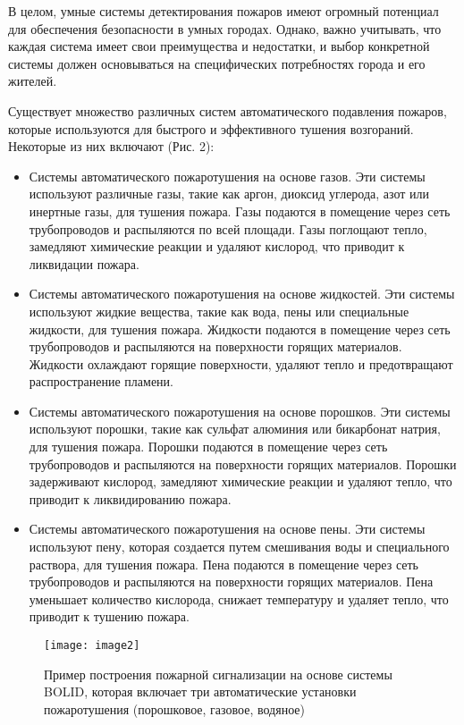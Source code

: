 \begin{multicols}{2}
В целом, умные системы детектирования пожаров имеют огромный потенциал
для обеспечения безопасности в умных городах. Однако, важно учитывать,
что каждая система имеет свои преимущества и недостатки, и выбор
конкретной системы должен основываться на специфических потребностях
города и его жителей.

Существует множество различных систем автоматического подавления
пожаров, которые используются для быстрого и эффективного тушения
возгораний. Некоторые из них включают (Рис. 2):

\begin{itemize}
\item
  Системы автоматического пожаротушения на основе газов. Эти системы
  используют различные газы, такие как аргон, диоксид углерода, азот или
  инертные газы, для тушения пожара. Газы подаются в помещение через
  сеть трубопроводов и распыляются по всей площади. Газы поглощают
  тепло, замедляют химические реакции и удаляют кислород, что приводит к
  ликвидации пожара.
\item
  Системы автоматического пожаротушения на основе жидкостей. Эти системы
  используют жидкие вещества, такие как вода, пены или специальные
  жидкости, для тушения пожара. Жидкости подаются в помещение через сеть
  трубопроводов и распыляются на поверхности горящих материалов.
  Жидкости охлаждают горящие поверхности, удаляют тепло и предотвращают
  распространение пламени.
\item
  Системы автоматического пожаротушения на основе порошков. Эти системы
  используют порошки, такие как сульфат алюминия или бикарбонат натрия,
  для тушения пожара. Порошки подаются в помещение через сеть
  трубопроводов и распыляются на поверхности горящих материалов. Порошки
  задерживают кислород, замедляют химические реакции и удаляют тепло,
  что приводит к ликвидированию пожара.
\item
  Системы автоматического пожаротушения на основе пены. Эти системы
  используют пену, которая создается путем смешивания воды и
  специального раствора, для тушения пожара. Пена подаются в помещение
  через сеть трубопроводов и распыляются на поверхности горящих
  материалов. Пена уменьшает количество кислорода, снижает температуру и
  удаляет тепло, что приводит к тушению пожара.
\end{itemize}

\end{multicols}

\begin{figure}[H]
  \centering
  \texttt{[image: image2]}
  \caption{Пример построения пожарной сигнализации на основе системы BOLID,
которая включает три автоматические установки пожаротушения (порошковое,
газовое, водяное)}
\end{figure}

